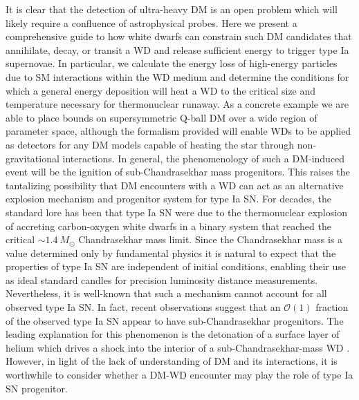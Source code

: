 \documentclass[twocolumn,preprintnumbers,amsmath,amssymb,prl, superscriptaddress]{revtex4}
\newcommand{\OO}{\mathcal{O}}
\begin{document}
It is clear that the detection of ultra-heavy DM is an open problem which will likely require a confluence of astrophysical probes.
Here we present a comprehensive guide to how white dwarfs can constrain such DM candidates that annihilate, decay, or transit a WD and release sufficient energy to trigger type Ia supernovae. 
In particular, we calculate the energy loss of high-energy particles due to SM interactions within the WD medium and determine the conditions for which a general energy deposition will heat a WD to the critical size and temperature necessary for thermonuclear runaway. 
As a concrete example we are able to place bounds on supersymmetric Q-ball DM over a wide region of parameter space, although the formalism provided will enable WDs to be applied as detectors for any DM models capable of heating the star through non-gravitational interactions. 
In general, the phenomenology of such a DM-induced event will be the ignition of sub-Chandrasekhar mass progenitors.
This raises the tantalizing possibility that DM encounters with a WD can act as an alternative explosion mechanism and progenitor system for type Ia SN. 
For decades, the standard lore has been that type Ia SN were due to the thermonuclear explosion of accreting carbon-oxygen white dwarfs in a binary system that reached the critical $\sim 1.4 ~M_{\odot}$ Chandrasekhar mass limit. 
Since the Chandrasekhar mass is a value determined only by fundamental physics it is natural to expect that the properties of type Ia SN are independent of initial conditions, enabling their use as ideal standard candles for precision luminosity distance measurements. 
Nevertheless, it is well-known that such a mechanism cannot account for all observed type Ia SN. 
In fact, recent observations \cite{Scalzo:2014sap, Scalzo:2014wxa} suggest that an $\OO(1)$ fraction of the observed type Ia SN appear to have sub-Chandrasekhar progenitors.
The leading explanation for this phenomenon is the detonation of a surface layer of helium which drives a shock into the interior of a sub-Chandrasekhar-mass WD \cite{Woosley1994,Fink:2007fv}. 
However, in light of the lack of understanding of DM and its interactions, it is worthwhile to consider whether a DM-WD encounter may play the role of type Ia SN progenitor. 
\end{document}
